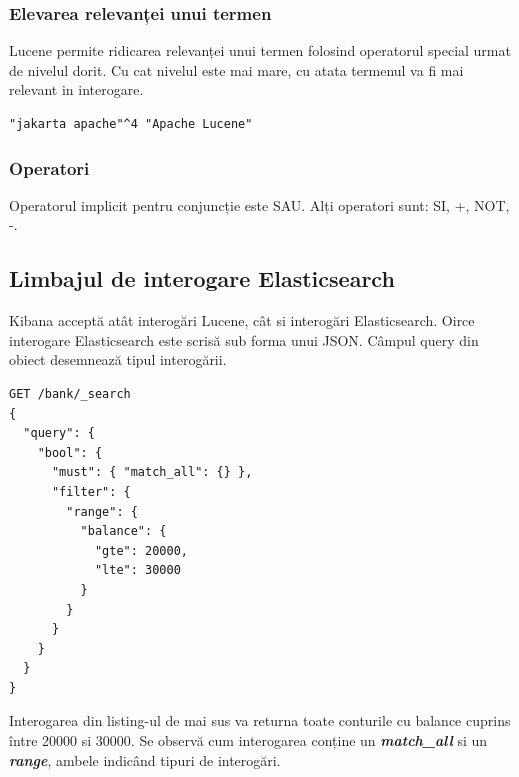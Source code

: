 \documentclass[12pt]{report}
\begin{document}
	\subsubsection{Elevarea relevanței unui termen}
Lucene permite ridicarea relevanței unui termen folosind operatorul special urmat de nivelul dorit. Cu cat nivelul este mai mare, cu atata termenul va fi mai relevant in interogare.
\begin{lstlisting}[caption={elevarea relevanței - Lucene query},captionpos=b]
"jakarta apache"^4 "Apache Lucene"
\end{lstlisting}

	\subsubsection{Operatori}
Operatorul implicit pentru conjuncție este SAU. Alți operatori sunt: SI, +, NOT, -.

	\subsection{Limbajul de interogare Elasticsearch}

Kibana acceptă atât interogări Lucene, cât si interogări Elasticsearch. Oirce interogare Elasticsearch este scrisă sub forma unui JSON. Câmpul query din obiect desemnează tipul interogării.
 
\begin{lstlisting}[caption={exemplu interogare Elasticsearch - JSON},captionpos=b]
GET /bank/_search
{
  "query": {
    "bool": {
      "must": { "match_all": {} },
      "filter": {
        "range": {
          "balance": {
            "gte": 20000,
            "lte": 30000
          }
        }
      }
    }
  }
}
\end{lstlisting}

Interogarea din listing-ul de mai sus va returna toate conturile cu balance cuprins între 20000 si 30000. Se observă cum interogarea conține un {\textbf{\textit{match\_all}}} si un \textbf{\textit{range}}, ambele indicând tipuri de interogări.
\end{document}
